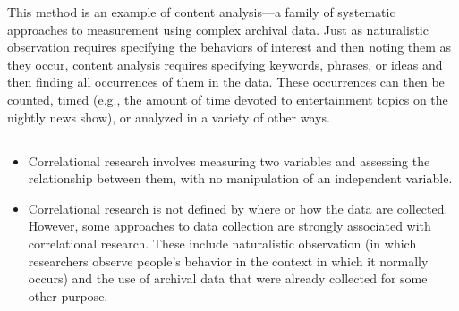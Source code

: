 This method is an example of content analysis---a family of systematic approaches to measurement using complex archival data. Just as naturalistic observation requires specifying the behaviors of interest and then noting them as they occur, content analysis requires specifying keywords, phrases, or ideas and then finding all occurrences of them in the data. These occurrences can then be counted, timed (e.g., the amount of time devoted to entertainment topics on the nightly news show), or analyzed in a variety of other ways.


\subsection{}

\begin{fullwidth}

\begin{itemize}


\item Correlational research involves measuring two variables and assessing the relationship between them, with no manipulation of an independent variable.


\item Correlational research is not defined by where or how the data are collected. However, some approaches to data collection are strongly associated with correlational research. These include naturalistic observation (in which researchers observe people's behavior in the context in which it normally occurs) and the use of archival data that were already collected for some other purpose.


\end{itemize}

\end{fullwidth}



\subsection{}

